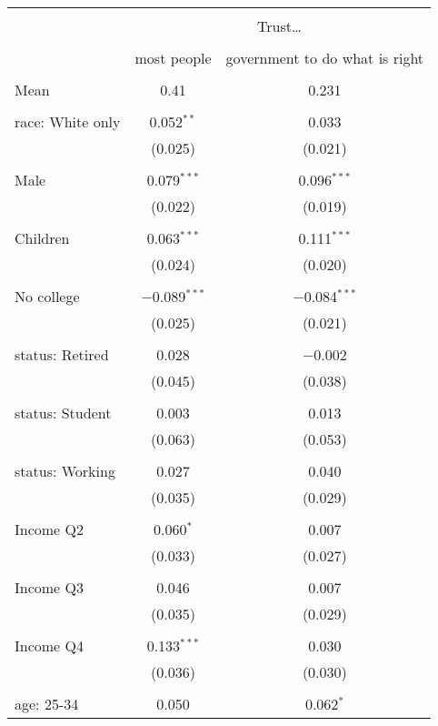 
\begin{tabular}{@{\extracolsep{5pt}}lcc} 
\\[-1.8ex]\hline 
\hline \\[-1.8ex] 
 & \multicolumn{2}{c}{Trust…} \\ 
\cline{2-3} 
\\[-1.8ex] & most people & government to do what is right \\ 
\hline \\[-1.8ex] 
 Mean & 0.41 & 0.231  \\ \hline \\[-1.8ex] race: White only & 0.052$^{**}$ & 0.033 \\ 
  & (0.025) & (0.021) \\ 
  & & \\ 
 Male & 0.079$^{***}$ & 0.096$^{***}$ \\ 
  & (0.022) & (0.019) \\ 
  & & \\ 
 Children & 0.063$^{***}$ & 0.111$^{***}$ \\ 
  & (0.024) & (0.020) \\ 
  & & \\ 
 No college & $-$0.089$^{***}$ & $-$0.084$^{***}$ \\ 
  & (0.025) & (0.021) \\ 
  & & \\ 
 status: Retired & 0.028 & $-$0.002 \\ 
  & (0.045) & (0.038) \\ 
  & & \\ 
 status: Student & 0.003 & 0.013 \\ 
  & (0.063) & (0.053) \\ 
  & & \\ 
 status: Working & 0.027 & 0.040 \\ 
  & (0.035) & (0.029) \\ 
  & & \\ 
 Income Q2 & 0.060$^{*}$ & 0.007 \\ 
  & (0.033) & (0.027) \\ 
  & & \\ 
 Income Q3 & 0.046 & 0.007 \\ 
  & (0.035) & (0.029) \\ 
  & & \\ 
 Income Q4 & 0.133$^{***}$ & 0.030 \\ 
  & (0.036) & (0.030) \\ 
  & & \\ 
 age: 25-34 & 0.050 & 0.062$^{*}$ \\ 

\end{tabular}
